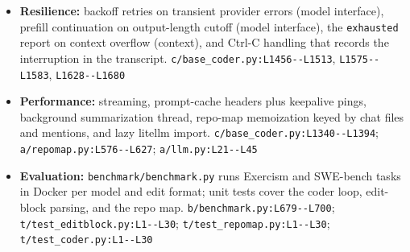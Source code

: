 \begin{itemize}
\item \textbf{Resilience:} backoff retries on transient provider errors (model interface), prefill continuation on output-length cutoff (model interface), the \texttt{exhausted} report on context overflow (context), and Ctrl-C handling that records the interruption in the transcript. \texttt{c/\allowbreak{}base\_\allowbreak{}coder.\allowbreak{}py:\allowbreak{}L1456-\allowbreak{}-\allowbreak{}L1513}, \texttt{L1575-\allowbreak{}-\allowbreak{}L1583}, \texttt{L1628-\allowbreak{}-\allowbreak{}L1680}
\item \textbf{Performance:} streaming, prompt-cache headers plus keepalive pings, background summarization thread, repo-map memoization keyed by chat files and mentions, and lazy litellm import. \texttt{c/\allowbreak{}base\_\allowbreak{}coder.\allowbreak{}py:\allowbreak{}L1340-\allowbreak{}-\allowbreak{}L1394}; \texttt{a/\allowbreak{}repomap.\allowbreak{}py:\allowbreak{}L576-\allowbreak{}-\allowbreak{}L627}; \texttt{a/\allowbreak{}llm.\allowbreak{}py:\allowbreak{}L21-\allowbreak{}-\allowbreak{}L45}
\item \textbf{Evaluation:} \texttt{benchmark/\allowbreak{}benchmark.\allowbreak{}py} runs Exercism and SWE-bench tasks in Docker per model and edit format; unit tests cover the coder loop, edit-block parsing, and the repo map. \texttt{b/\allowbreak{}benchmark.\allowbreak{}py:\allowbreak{}L679-\allowbreak{}-\allowbreak{}L700}; \texttt{t/\allowbreak{}test\_\allowbreak{}editblock.\allowbreak{}py:\allowbreak{}L1-\allowbreak{}-\allowbreak{}L30}; \texttt{t/\allowbreak{}test\_\allowbreak{}repomap.\allowbreak{}py:\allowbreak{}L1-\allowbreak{}-\allowbreak{}L30}; \texttt{t/\allowbreak{}test\_\allowbreak{}coder.\allowbreak{}py:\allowbreak{}L1-\allowbreak{}-\allowbreak{}L30}
\end{itemize}

